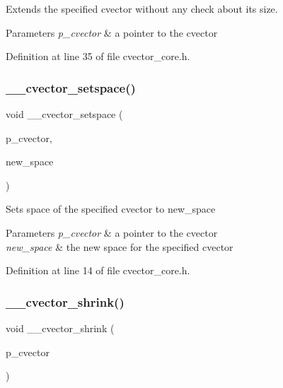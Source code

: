 Extends the specified cvector without any check about its size. 
\begin{DoxyParams}{Parameters}
{\em p\+\_\+cvector} & a pointer to the cvector \\
\hline
\end{DoxyParams}


Definition at line 35 of file cvector\+\_\+core.\+h.

\mbox{\label{cvector__core_8h_a2b3fb7098225f258606f6e87d51a293f}} 
\subsubsection{\+\_\+\+\_\+cvector\+\_\+setspace()}
{\footnotesize\ttfamily void \+\_\+\+\_\+cvector\+\_\+setspace (\begin{DoxyParamCaption}\item[{\textbf{ cvector} $\ast$}]{p\+\_\+cvector,  }\item[{\textbf{ index\+\_\+t}}]{new\+\_\+space }\end{DoxyParamCaption})}

Sets space of the specified cvector to new\+\_\+space 
\begin{DoxyParams}{Parameters}
{\em p\+\_\+cvector} & a pointer to the cvector \\
\hline
{\em new\+\_\+space} & the new space for the specified cvector \\
\hline
\end{DoxyParams}


Definition at line 14 of file cvector\+\_\+core.\+h.

\mbox{\label{cvector__core_8h_a2ec9a92ee1097fb5aa38c4d30c2bd06d}} 
\subsubsection{\+\_\+\+\_\+cvector\+\_\+shrink()}
{\footnotesize\ttfamily void \+\_\+\+\_\+cvector\+\_\+shrink (\begin{DoxyParamCaption}\item[{\textbf{ cvector} $\ast$}]{p\+\_\+cvector }\end{DoxyParamCaption})}

